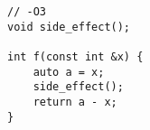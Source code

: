 \begin{lstlisting}[title=\href{https://godbolt.org/z/g6N6_U}{\texttt{godbolt.org/z/g6N6\_U}}]
// -O3
void side_effect();

int f(const int &x) {
    auto a = x;
    side_effect();
    return a - x;
}
\end{lstlisting}
